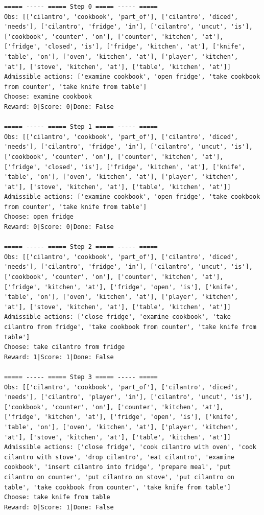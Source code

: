 \documentclass[11pt]{article}
\begin{document}
\begin{lstlisting}
===== ----- ===== Step 0 ===== ----- =====
Obs: [['cilantro', 'cookbook', 'part_of'], ['cilantro', 'diced', 'needs'], ['cilantro', 'fridge', 'in'], ['cilantro', 'uncut', 'is'], ['cookbook', 'counter', 'on'], ['counter', 'kitchen', 'at'], ['fridge', 'closed', 'is'], ['fridge', 'kitchen', 'at'], ['knife', 'table', 'on'], ['oven', 'kitchen', 'at'], ['player', 'kitchen', 'at'], ['stove', 'kitchen', 'at'], ['table', 'kitchen', 'at']]
Admissible actions: ['examine cookbook', 'open fridge', 'take cookbook from counter', 'take knife from table']
Choose: examine cookbook
Reward: 0|Score: 0|Done: False

===== ----- ===== Step 1 ===== ----- =====
Obs: [['cilantro', 'cookbook', 'part_of'], ['cilantro', 'diced', 'needs'], ['cilantro', 'fridge', 'in'], ['cilantro', 'uncut', 'is'], ['cookbook', 'counter', 'on'], ['counter', 'kitchen', 'at'], ['fridge', 'closed', 'is'], ['fridge', 'kitchen', 'at'], ['knife', 'table', 'on'], ['oven', 'kitchen', 'at'], ['player', 'kitchen', 'at'], ['stove', 'kitchen', 'at'], ['table', 'kitchen', 'at']]
Admissible actions: ['examine cookbook', 'open fridge', 'take cookbook from counter', 'take knife from table']
Choose: open fridge
Reward: 0|Score: 0|Done: False

===== ----- ===== Step 2 ===== ----- =====
Obs: [['cilantro', 'cookbook', 'part_of'], ['cilantro', 'diced', 'needs'], ['cilantro', 'fridge', 'in'], ['cilantro', 'uncut', 'is'], ['cookbook', 'counter', 'on'], ['counter', 'kitchen', 'at'], ['fridge', 'kitchen', 'at'], ['fridge', 'open', 'is'], ['knife', 'table', 'on'], ['oven', 'kitchen', 'at'], ['player', 'kitchen', 'at'], ['stove', 'kitchen', 'at'], ['table', 'kitchen', 'at']]
Admissible actions: ['close fridge', 'examine cookbook', 'take cilantro from fridge', 'take cookbook from counter', 'take knife from table']
Choose: take cilantro from fridge
Reward: 1|Score: 1|Done: False

===== ----- ===== Step 3 ===== ----- =====
Obs: [['cilantro', 'cookbook', 'part_of'], ['cilantro', 'diced', 'needs'], ['cilantro', 'player', 'in'], ['cilantro', 'uncut', 'is'], ['cookbook', 'counter', 'on'], ['counter', 'kitchen', 'at'], ['fridge', 'kitchen', 'at'], ['fridge', 'open', 'is'], ['knife', 'table', 'on'], ['oven', 'kitchen', 'at'], ['player', 'kitchen', 'at'], ['stove', 'kitchen', 'at'], ['table', 'kitchen', 'at']]
Admissible actions: ['close fridge', 'cook cilantro with oven', 'cook cilantro with stove', 'drop cilantro', 'eat cilantro', 'examine cookbook', 'insert cilantro into fridge', 'prepare meal', 'put cilantro on counter', 'put cilantro on stove', 'put cilantro on table', 'take cookbook from counter', 'take knife from table']
Choose: take knife from table
Reward: 0|Score: 1|Done: False


\end{lstlisting}
\end{document}
